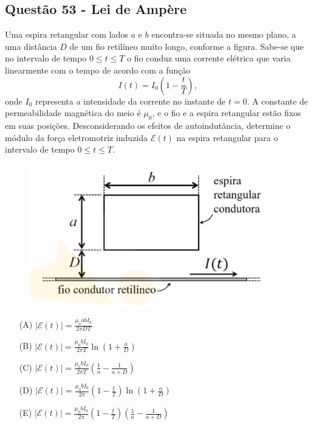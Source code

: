 \documentclass[a4paper,12pt]{article}
\begin{document}
\begin{flushleft}
\subsection{Questão 53 - Lei de Ampère}
Uma espira retangular com lados $a$ e $b$ encontra-se situada no mesmo plano, a uma distância $D$ de um fio retilíneo muito longo, 
conforme a figura. Sabe-se que no intervalo de tempo $0 \le t \le T$ o fio conduz uma corrente elétrica que varia linearmente 
com o tempo de acordo com a função 
\[
I(t) = I_0 \left(1 - \frac{t}{T}\right),
\] 
onde $I_0$ representa a intensidade da corrente no instante de $t=0$. A constante de permeabilidade magnética do meio é $\mu_0$, 
e o fio e a espira retangular estão fixos em suas posições. Desconsiderando os efeitos de autoindutância, determine o módulo da 
força eletromotriz induzida $\mathcal{E}(t)$ na espira retangular para o intervalo de tempo $0 \le t \le T$.

\begin{figure}[!h]
  \centering
  \includegraphics[scale=0.6]{figures/lei_de_ampere.png}
\end{figure}

\begin{itemize}
\item[(A)] $|\mathcal{E}(t)| = \frac{\mu_0 a b I_0}{2 \pi D T}$
\item[(B)] $|\mathcal{E}(t)| = \frac{\mu_0 b I_0}{2 \pi T} \ln \left( 1 + \frac{a}{D} \right)$
\item[(C)] $|\mathcal{E}(t)| = \frac{\mu_0 b I_0}{2 \pi T} \left( \frac{1}{a} - \frac{1}{a+D} \right)$
\item[(D)] $|\mathcal{E}(t)| = \frac{\mu_0 b I_0}{2 \pi} \left( 1 - \frac{t}{T} \right) \ln \left( 1 + \frac{a}{D} \right)$
\item[(E)] $|\mathcal{E}(t)| = \frac{\mu_0 b I_0}{2 \pi} \left( 1 - \frac{t}{T} \right) \left( \frac{1}{a} - \frac{1}{a+D} \right)$
\end{itemize}



\end{flushleft}
\end{document}
